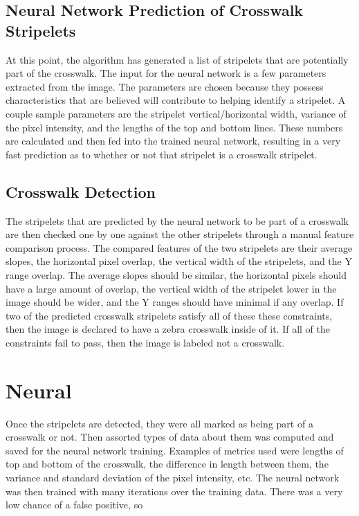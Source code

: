 \documentclass[12pt]{ucthesis}
\begin{document}
\subsection{Neural Network Prediction of Crosswalk Stripelets}

At this point, the algorithm has generated a list of stripelets that are potentially part of the crosswalk. The input for the neural network is a few parameters extracted from the image. The parameters are chosen because they possess characteristics that are believed will contribute to helping identify a stripelet. A couple sample parameters are the stripelet vertical/horizontal width, variance of the pixel intensity, and the lengths of the top and bottom lines. These numbers are calculated and then fed into the trained neural network, resulting in a very fast prediction as to whether or not that stripelet is a crosswalk stripelet.

\subsection{Crosswalk Detection}

The stripelets that are predicted by the neural network to be part of a crosswalk are then checked one by one against the other stripelets through a manual feature comparison process. The compared features of the two stripelets are their average slopes, the horizontal pixel overlap, the vertical width of the stripelets, and the Y range overlap. The average slopes should be similar, the horizontal pixels should have a large amount of overlap, the vertical width of the stripelet lower in the image should be wider, and the Y ranges should have minimal if any overlap. If two of the predicted crosswalk stripelets satisfy all of these these constraints, then the image is declared to have a zebra crosswalk inside of it. If all of the constraints fail to pass, then the image is labeled not a crosswalk. 


\section{Neural}

Once the stripelets are detected, they were all marked as being part of a crosswalk or not. Then assorted types of data about them was computed and saved for the neural network training. Examples of metrics used were lengths of top and bottom of the crosswalk, the difference in length between them, the variance and standard deviation of the pixel intensity, etc. The neural network was then trained with many iterations over the training data. There was a very low chance of a false positive, so 
\end{document}

